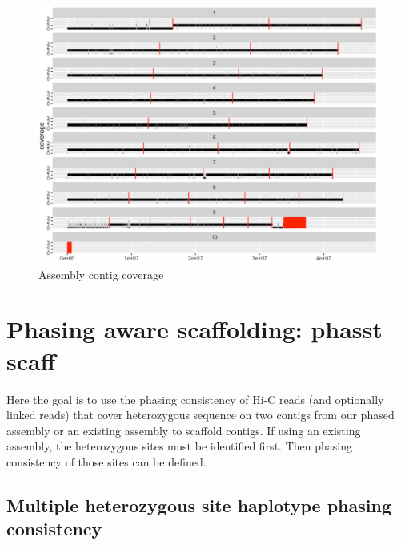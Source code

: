 \begin{figure}[htbp!]
\caption{Assembly contig coverage}
\label{figure:contigcoverage}
\begin{centering}
\includegraphics[width=\textwidth]{assemblycontigcoverage.png}
\end{centering}

\end{figure}

\clearpage

\section{Phasing aware scaffolding: phasst scaff}

\par{
Here the goal is to use the phasing consistency of Hi-C reads (and optionally linked reads) that cover heterozygous sequence on two contigs from our phased assembly or an existing assembly to scaffold contigs. If using an existing assembly, the heterozygous sites must be identified first. Then phasing consistency of those sites can be defined.
}

\subsection{Multiple heterozygous site haplotype phasing consistency}

